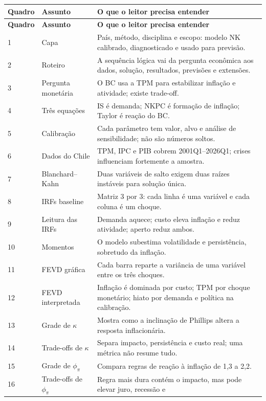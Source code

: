 \documentclass[11pt,a4paper]{article}
\begin{document}
\small
\begin{longtable}{@{}p{}p{}p{}@{}}
\toprule
\textbf{Quadro} & \textbf{Assunto} & \textbf{O que o leitor precisa entender} \\
\midrule
\endfirsthead
\toprule
\textbf{Quadro} & \textbf{Assunto} & \textbf{O que o leitor precisa entender} \\
\midrule
\endhead
1 & Capa & País, método, disciplina e escopo: modelo NK calibrado, diagnosticado e usado para
previsão. \\
2 & Roteiro & A sequência lógica vai da pergunta econômica aos dados, solução, resultados,
previsões e extensões. \\
3 & Pergunta monetária & O BC usa a TPM para estabilizar inflação e atividade; existe trade-off. \\
4 & Três equações & IS é demanda; NKPC é formação de inflação; Taylor é reação do BC. \\
5 & Calibração & Cada parâmetro tem valor, alvo e análise de sensibilidade; não são números soltos. \\
6 & Dados do Chile & TPM, IPC e PIB cobrem 2001Q1--2026Q1; crises influenciam fortemente a amostra. \\
7 & Blanchard--Kahn & Duas variáveis de salto exigem duas raízes instáveis para solução única. \\
8 & IRFs baseline & Matriz 3 por 3: cada linha é uma variável e cada coluna é um choque. \\
9 & Leitura das IRFs & Demanda aquece; custo eleva inflação e reduz atividade; aperto reduz ambos. \\
10 & Momentos & O modelo subestima volatilidade e persistência, sobretudo da inflação. \\
11 & FEVD gráfica & Cada barra reparte a variância de uma variável entre os três choques. \\
12 & FEVD interpretada & Inflação é dominada por custo; TPM por choque monetário; hiato por demanda
e política na calibração. \\
13 & Grade de $\kappa$ & Mostra como a inclinação de Phillips altera a resposta inflacionária. \\
14 & Trade-offs de $\kappa$ & Separa impacto, persistência e custo real; uma métrica não resume tudo. \\
15 & Grade de $\phi_\pi$ & Compara regras de reação à inflação de 1,3 a 2,2. \\
16 & Trade-offs de $\phi_\pi$ & Regra mais dura contém o impacto, mas pode elevar juro, recessão e

\end{longtable}
\end{document}
